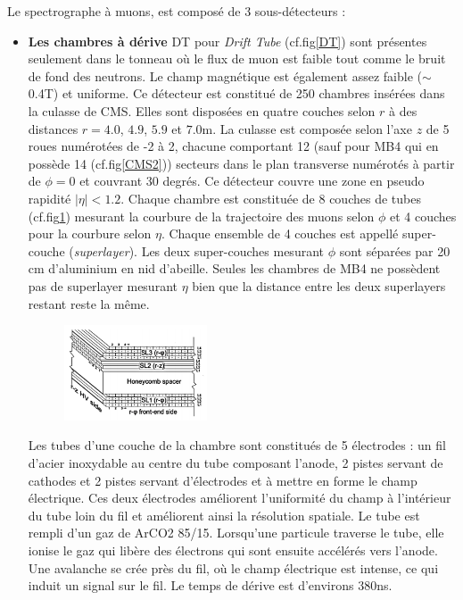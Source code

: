 Le spectrographe à muons, est composé de 3 sous-détecteurs :
\begin{itemize}[label=$\bullet$]
	\item \textbf{Les chambres à dérive} DT pour \textit{Drift Tube} (cf.fig\ref{DT}) sont présentes seulement dans le tonneau où le flux de muon est faible tout comme le bruit de fond des neutrons. Le champ magnétique est également assez faible ($\sim$0.4T) et uniforme. Ce détecteur est constitué de 250 chambres insérées dans la culasse de CMS. Elles sont disposées en quatre couches selon $r$ à des distances $r=4.0$, $4.9$, $5.9$ et $7.0$m. La culasse est composée selon l'axe $z$ de 5 roues numérotées de -2 à 2, chacune comportant 12 (sauf pour MB4 qui en possède 14 (cf.fig\ref{CMS2})) secteurs dans le plan transverse numérotés à partir de $\phi=0$ et couvrant 30 degrés. Ce détecteur couvre une zone en pseudo rapidité $|\eta|<1.2$. Chaque chambre est constituée de 8 couches de tubes (cf.fig\ref{DT1}) mesurant la courbure de la trajectoire des muons selon $\phi$ et 4 couches pour la courbure selon $\eta$. Chaque ensemble de 4 couches est appellé super-couche (\textit{superlayer}). Les deux super-couches mesurant $\phi$ sont séparées par 20 cm d'aluminium en nid d'abeille. Seules les chambres de MB4 ne possèdent pas de superlayer mesurant $\eta$ bien que la distance entre les deux superlayers restant reste la même.
	\begin{figure}[ht!]
		\centering
		\includegraphics[width=0.40\textwidth]{CMS/DTchamber.png}
		\label{DT1}
	\end{figure}

    Les tubes d'une couche de la chambre sont constitués de 5 électrodes : un fil d'acier inoxydable au centre du tube composant l'anode, 2 pistes servant de cathodes et 2 pistes servant d'électrodes et à mettre en forme le champ électrique. Ces deux électrodes améliorent l'uniformité du champ à l'intérieur du tube loin du fil et améliorent ainsi la résolution spatiale. Le tube est rempli d'un gaz de ArCO2 85/15. Lorsqu'une particule traverse le tube, elle ionise le gaz qui libère des électrons qui sont ensuite accélérés vers l'anode. Une avalanche se crée près du fil, où le champ électrique est intense, ce qui induit un signal sur le fil. Le temps de dérive est d'environs 380ns. 
    

\end{itemize}
